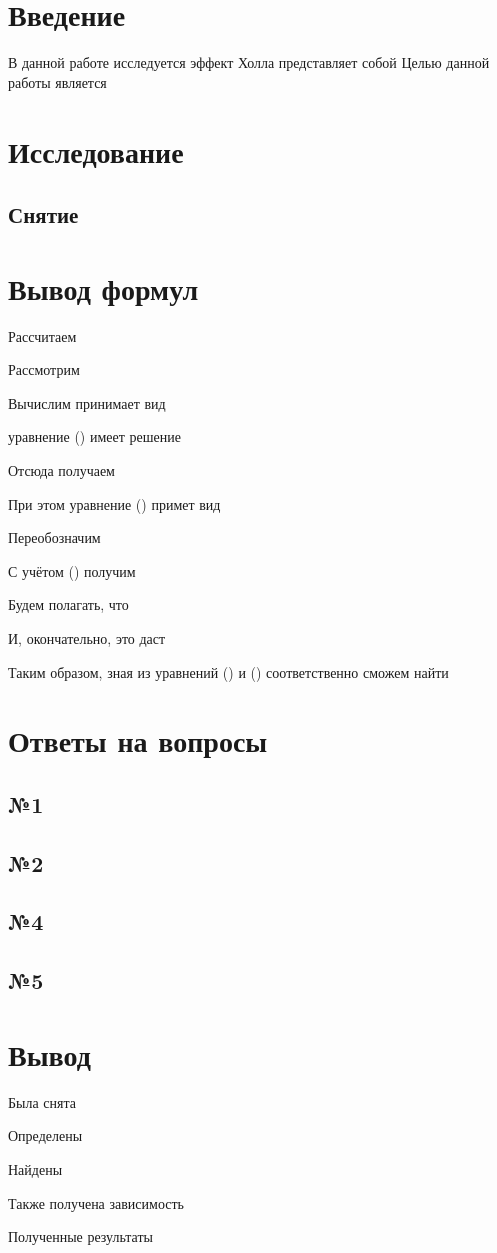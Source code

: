 



\def\labauthors{Понур К.А., Сарафанов Ф.Г., Сидоров Д.А.}
\def\labgroup{420}
\def\labnumber{000}
\def\labtheme{Эффект Холла}



\tableofcontents
\newpage

\section*{Введение}
\label{sec:input}

В данной работе исследуется эффект Холла  
представляет собой
Целью данной работы является 


\newpage
\section{Исследование}
\subsection{Снятие}


\newpage
\section{Вывод формул}
Рассчитаем 

Рассмотрим 

Вычислим
принимает вид

уравнение () имеет решение

Отсюда получаем

При этом уравнение () примет вид

Переобозначим 

С учётом () получим

Будем полагать, что 

И, окончательно, это даст 


Таким образом, зная из уравнений () и () соответственно сможем найти 

\newpage
\section{Ответы на вопросы}

\subsection{№1}
\subsection{№2}
\subsection{№4}
\subsection{№5}


\newpage
\section{Вывод}

Была снята 

Определены 

Найдены 

Также получена зависимость 

Полученные результаты  



